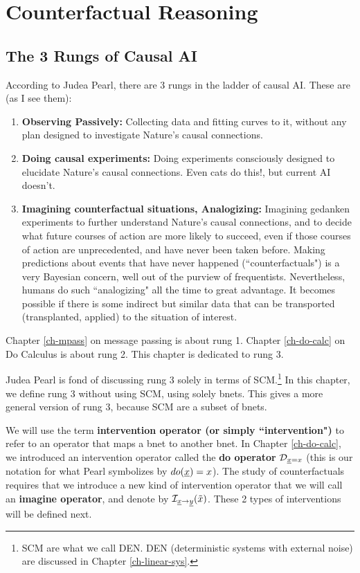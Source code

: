 \chapter{Counterfactual Reasoning}
\label{ch-counterf}


\section{The 3 Rungs of Causal AI}
According to 
Judea Pearl,
there are 3 rungs in the
ladder of causal AI.
These are (as I see them):
\begin{enumerate}
\item
{\bf Observing Passively:} Collecting 
data
and fitting curves to it,
without any plan 
designed to
investigate Nature's 
causal connections.
\item {\bf Doing causal
experiments:} 
Doing experiments 
consciously designed to
elucidate
Nature's causal connections.
Even cats do this!, but current AI doesn't.
\item {\bf Imagining
 counterfactual situations, Analogizing:}
Imagining gedanken experiments
to further understand
Nature's causal connections,
and to decide what future
courses of action are
more likely to succeed,
even if
those courses of action
are unprecedented, and have never been taken before.
Making
predictions about
 events that have never happened (``counterfactuals")
is a very Bayesian
concern, well out of the purview of 
frequentists. Nevertheless,
humans do such
``analogizing" 
all the time to great advantage.
It becomes
possible if there
is some indirect but similar
data that can be transported
(transplanted, applied)
to the situation of
interest.
\end{enumerate}
Chapter \ref{ch-mpass}
on message passing
is about rung 1.
Chapter \ref{ch-do-calc}
on Do Calculus is about rung 2.
This chapter is dedicated to rung 3.

Judea Pearl 
is fond of discussing rung 3 solely
in terms of SCM.\footnote{SCM are 
what we call DEN. DEN (deterministic systems
with external noise) are discussed in
Chapter \ref{ch-linear-sys}. }
In this chapter,
we define rung 3
without using SCM, using solely
bnets.
This gives a more general
version of rung 3,
because SCM are a subset of bnets.



We will use the
term {\bf intervention operator (or simply ``intervention")} 
to refer to an operator
that maps a bnet to another bnet.
In Chapter \ref{ch-do-calc},
we introduced an intervention operator
 called the {\bf do operator}
${\cal D}_{{\underline{x}}=x}$ (this is our notation for what Pearl 
symbolizes by $do({\underline{x}})=x$).
The study of counterfactuals 
requires that we
introduce a new
kind of intervention 
operator that we will
call an {\bf imagine operator},
and denote by ${\cal I}_{{\underline{x}}\rightarrow{\underline{y}}}(\tilde{x})$.
These 2 types of interventions 
will be defined 
next.

